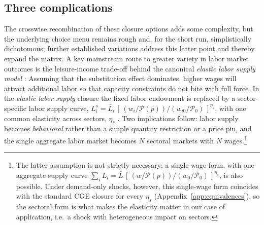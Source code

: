 

\subsection{Three complications}\label{subsec:complications}

The crosswise recombination of these closure options adds some complexity, but the underlying choice menu remains rough and, for the short run, simplistically dichotomous; further established variations address this latter point and thereby expand the matrix. A key mainstream route to greater variety in labor market outcomes is the leisure-income trade-off behind the canonical \textit{elastic labor supply model} \citep{deMeloTarr.1992}: Assuming that the substitution effect dominates, higher wages will attract additional labor so that capacity constraints do not bite with full force. In the \emph{elastic labor supply} closure the fixed labor endowment is replaced by a sector-specific labor supply curve, $L_i^{s} = \bar L_i\,[\,(w_i/\mathcal{P}(p))/(w_{i0}/\mathcal{P}_{0})\,]^{\eta_s}$, with one common elasticity across sectors, $\eta_s$ \citep{Roy.1951,Lagakos.2013,Galle.2023}. Two implications follow: labor supply becomes \emph{behavioral} rather than a simple quantity restriction or a price pin, and the single aggregate labor market becomes $N$ sectoral markets with $N$ wages.\footnote{The latter assumption is not strictly necessary: a single-wage form, with one aggregate supply curve $\sum_i L_i = \bar L\,[\,(w/\mathcal{P}(p))/(w_{0}/\mathcal{P}_{0})\,]^{\eta_s}$, is also possible. Under demand-only shocks, however, this single-wage form coincides with the standard CGE closure for every $\eta_s$ (Appendix~\ref{app:equivalences}), so the sectoral form is what makes the elasticity matter in our case of application, i.e.\ a shock with heterogeneous impact on sectors.}


